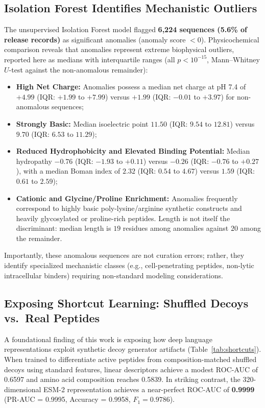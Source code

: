 \documentclass[unnumsec,webpdf,contemporary,large]{oup-authoring-template}%
\begin{document}
\subsection{Isolation Forest Identifies Mechanistic Outliers}

The unsupervised Isolation Forest model flagged \textbf{6,224 sequences (5.6\% of release records)} as significant anomalies (anomaly score $<0$). Physicochemical comparison reveals that anomalies represent extreme biophysical outliers, reported here as medians with interquartile ranges (all $p < 10^{-15}$, Mann--Whitney $U$-test against the non-anomalous remainder):
\begin{itemize}
    \item \textbf{High Net Charge:} Anomalies possess a median net charge at pH 7.4 of $+4.99$ (IQR: $+1.99$ to $+7.99$) versus $+1.99$ (IQR: $-0.01$ to $+3.97$) for non-anomalous sequences;
    \item \textbf{Strongly Basic:} Median isoelectric point $11.50$ (IQR: $9.54$ to $12.81$) versus $9.70$ (IQR: $6.53$ to $11.29$);
    \item \textbf{Reduced Hydrophobicity and Elevated Binding Potential:} Median hydropathy $-0.76$ (IQR: $-1.93$ to $+0.11$) versus $-0.26$ (IQR: $-0.76$ to $+0.27$), with a median Boman index of $2.32$ (IQR: $0.54$ to $4.67$) versus $1.59$ (IQR: $0.61$ to $2.59$);
    \item \textbf{Cationic and Glycine/Proline Enrichment:} Anomalies frequently correspond to highly basic poly-lysine/arginine synthetic constructs and heavily glycosylated or proline-rich peptides. Length is not itself the discriminant: median length is $19$ residues among anomalies against $20$ among the remainder.
\end{itemize}
Importantly, these anomalous sequences are not curation errors; rather, they identify specialized mechanistic classes (e.g., cell-penetrating peptides, non-lytic intracellular binders) requiring non-standard modeling considerations.

\subsection{Exposing Shortcut Learning: Shuffled Decoys vs.\ Real Peptides}

A foundational finding of this work is exposing how deep language representations exploit synthetic decoy generator artifacts (Table~\ref{tab:shortcuts}). When trained to differentiate active peptides from composition-matched shuffled decoys using standard features, linear descriptors achieve a modest ROC-AUC of 0.6597 and amino acid composition reaches 0.5839. In striking contrast, the 320-dimensional ESM-2 representation achieves a near-perfect ROC-AUC of \textbf{0.9999} (PR-AUC = 0.9995, Accuracy = 0.9958, $F_1 = 0.9786$).
\end{document}
